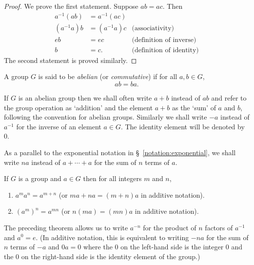 \begin{proof}
    We prove the first statement. Suppose \(ab = ac\). Then
    \begin{align*}
        a^{-1}(ab) &= a^{-1}(ac) &\\
        (a^{-1}a)b &= (a^{-1}a)c &\text{(associativity)}\\
        eb &= ec &\text{(definition of inverse)}\\
        b &= c. &\text{(definition of identity)}
    \end{align*}
    The second statement is proved similarly.
\end{proof}

\begin{definition}
    A group \(G\) is said to be \emph{abelian} (or \emph{commutative}) if for
    all \(a, b \in G\),
    \[
        ab = ba.
    \]
\end{definition}

\begin{notation}
    If \(G\) is an abelian group then we shall often write \(a + b\) instead of
    \(ab\) and refer to the group operation as `addition' and the element \(a +
    b\) as the `sum' of \(a\) and \(b\), following the convention for abelian
    groups. Similarly we shall write \(-a\) instead of \(a^{-1}\) for the
    inverse of an element \(a \in G\). The identity element will be denoted by
    \(0\).

    As a parallel to the exponential notation in \S~\ref{notation:exponential},
    we shall write \(na\) instead of \(a + \cdots + a\) for the sum of \(n\)
    terms of \(a\).
\end{notation}

\begin{theorem}
    If \(G\) is a group and \(a \in G\) then for all integers \(m\) and \(n\),
    \begin{enumerate}[label=(\alph*)]
        \item \(a^m a^n = a^{m + n}\) (or \(ma + na = (m + n)a\) in additive
        notation).
        \item \((a^m)^n = a^{mn}\) (or \(n(ma) = (mn)a\) in additive notation).
    \end{enumerate}
\end{theorem}

\begin{remark}
    The preceding theorem allows us to write \(a^{-n}\) for the product of \(n\)
    factors of \(a^{-1}\) and \(a^0 = e\). (In additive notation, this is
    equivalent to writing \(-na\) for the sum of \(n\) terms of \(-a\) and \(0a
    = 0\) where the \(0\) on the left-hand side is the integer \(0\) and the
    \(0\) on the right-hand side is the identity element of the group.)
\end{remark}

